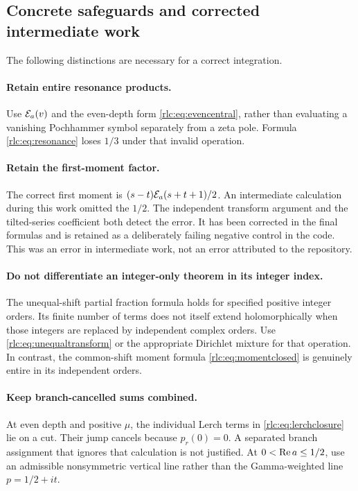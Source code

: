 \subsection{Concrete safeguards and corrected intermediate work}
The following distinctions are necessary for a correct integration.

\paragraph{Retain entire resonance products.}
Use $\mathcal E_a(v)$ and the even-depth form
\eqref{rlc:eq:evencentral}, rather than evaluating a vanishing
Pochhammer symbol separately from a zeta pole. Formula
\eqref{rlc:eq:resonance} loses $1/3$ under that invalid operation.

\paragraph{Retain the first-moment factor.}
The correct first moment is $(s-t)\mathcal E_a(s+t+1)/2$.
An intermediate calculation during this work omitted the $1/2$.
The independent transform argument and the tilted-series coefficient
both detect the error. It has been corrected in the final formulas and
is retained as a deliberately failing negative control in the code.
This was an error in intermediate work, not an error attributed to the
repository.

\paragraph{Do not differentiate an integer-only theorem in its integer index.}
The unequal-shift partial fraction formula holds for specified positive
integer orders. Its finite number of terms does not itself extend
holomorphically when those integers are replaced by independent complex
orders. Use \eqref{rlc:eq:unequaltransform} or the appropriate Dirichlet
mixture for that operation. In contrast, the common-shift moment formula
\eqref{rlc:eq:momentclosed} is genuinely entire in its independent orders.

\paragraph{Keep branch-cancelled sums combined.}
At even depth and positive $\mu$, the individual Lerch terms in
\eqref{rlc:eq:lerchclosure} lie on a cut. Their jump cancels because
$p_r(0)=0$. A separated branch assignment that ignores that calculation
is not justified. At $0<\operatorname{Re} a\le1/2$, use an admissible nonsymmetric
vertical line rather than the Gamma-weighted line $p=1/2+it$.

